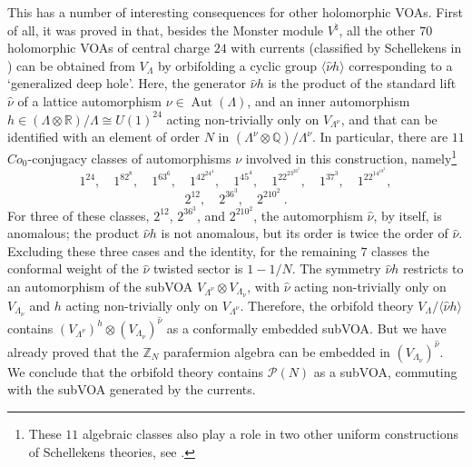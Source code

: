 \documentclass[11pt,reqno]{article}
\newcommand{\be}{\begin{equation}}
\newcommand{\ee}{\end{equation}}
\DeclareMathOperator{\Aut}{Aut}
\newcommand{\ZZ}{\mathbb{Z}}
\newcommand{\RR}{\mathbb{R}}
\newcommand{\QQ}{\mathbb{Q}}
\newcommand{\paraf}{\mathcal{P}}
\begin{document}
This has a number of interesting consequences for other holomorphic VOAs. First of all, it was proved in \cite{MollerScheithauer2023,MollerScheithauer2024} that, besides the Monster module $V^\natural$, all the other $70$ holomorphic VOAs of central charge $24$ with currents (classified by Schellekens in \cite{Schellekens1993})  can be obtained from $V_\Lambda$ by orbifolding a cyclic group $\langle \hat\nu h\rangle$ corresponding to a `generalized deep hole'. Here, the generator $\hat\nu h$ is the product of the standard lift $\hat \nu$ of a lattice automorphism $\nu\in \Aut(\Lambda)$, and an inner automorphism  $h\in (\Lambda\otimes \RR)/\Lambda\cong U(1)^{24}$ acting non-trivially only on $V_{\Lambda^\nu}$, and that can be identified with an element of order $N$ in $(\Lambda^\nu\otimes \QQ)/\Lambda^\nu$. In particular, there are $11$ $Co_0$-conjugacy classes of automorphisms $\nu$ involved in this construction, namely\footnote{These $11$ algebraic classes also play a role in two other  uniform constructions of Schellekens theories, see \cite{Hoehn2017GenusMoonshine,HohnMoller2022}.}
\be\label{goodnus} 1^{24},\quad 1^82^8,\quad 1^63^6,\quad 1^42^24^4,\quad 1^45^4,\quad 1^22^23^26^2,\quad 1^37^3,\quad 1^22^14^18^2,
\ee
\be 2^{12},\quad 2^36^3,\quad 2^210^2\ .
\ee 
 For three of these classes, $2^{12}$, $2^36^3$, and $2^210^2$, the automorphism $\hat\nu$, by itself, is anomalous; the product $\hat\nu h$ is not anomalous, but its order is twice the order of $\hat\nu$. Excluding these three cases and the identity, for the remaining $7$ classes the conformal weight of the $\hat\nu$ twisted sector is $1-1/N$. The symmetry $\hat\nu h$ restricts to an automorphism of the subVOA $V_{\Lambda^\nu}\otimes V_{\Lambda_\nu}$, with $\hat\nu$ acting non-trivially only on $V_{\Lambda_\nu}$ and $h$ acting non-trivially only on $V_{\Lambda^\nu}$. Therefore, the orbifold theory $V_\Lambda/\langle \hat\nu h\rangle$ contains $(V_{\Lambda^\nu})^h\otimes (V_{\Lambda_\nu})^{\hat\nu}$ as a conformally embedded subVOA. But we have already proved that the $\ZZ_N$ parafermion algebra can be embedded in $(V_{\Lambda_\nu})^{\hat\nu}$. We conclude that the orbifold theory contains $\paraf(N)$ as a subVOA, commuting with the subVOA generated by the currents.
 
\end{document}

